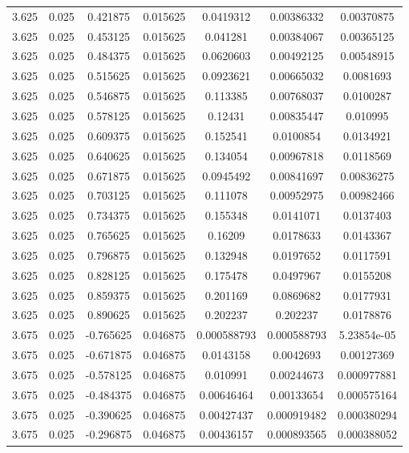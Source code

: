 \begin{table}[bh]
\begin{center}
{\begin{tabular}{ccccccc}
3.625	 & 0.025 & 	0.421875	 & 0.015625	 & 0.0419312	 & 0.00386332	 & 0.00370875 \\ 
3.625	 & 0.025 & 	0.453125	 & 0.015625	 & 0.041281	 & 0.00384067	 & 0.00365125 \\ 
3.625	 & 0.025 & 	0.484375	 & 0.015625	 & 0.0620603	 & 0.00492125	 & 0.00548915 \\ 
3.625	 & 0.025 & 	0.515625	 & 0.015625	 & 0.0923621	 & 0.00665032	 & 0.0081693 \\ 
3.625	 & 0.025 & 	0.546875	 & 0.015625	 & 0.113385	 & 0.00768037	 & 0.0100287 \\ 
3.625	 & 0.025 & 	0.578125	 & 0.015625	 & 0.12431	 & 0.00835447	 & 0.010995 \\ 
3.625	 & 0.025 & 	0.609375	 & 0.015625	 & 0.152541	 & 0.0100854	 & 0.0134921 \\ 
3.625	 & 0.025 & 	0.640625	 & 0.015625	 & 0.134054	 & 0.00967818	 & 0.0118569 \\ 
3.625	 & 0.025 & 	0.671875	 & 0.015625	 & 0.0945492	 & 0.00841697	 & 0.00836275 \\ 
3.625	 & 0.025 & 	0.703125	 & 0.015625	 & 0.111078	 & 0.00952975	 & 0.00982466 \\ 
3.625	 & 0.025 & 	0.734375	 & 0.015625	 & 0.155348	 & 0.0141071	 & 0.0137403 \\ 
3.625	 & 0.025 & 	0.765625	 & 0.015625	 & 0.16209	 & 0.0178633	 & 0.0143367 \\ 
3.625	 & 0.025 & 	0.796875	 & 0.015625	 & 0.132948	 & 0.0197652	 & 0.0117591 \\ 
3.625	 & 0.025 & 	0.828125	 & 0.015625	 & 0.175478	 & 0.0497967	 & 0.0155208 \\ 
3.625	 & 0.025 & 	0.859375	 & 0.015625	 & 0.201169	 & 0.0869682	 & 0.0177931 \\ 
3.625	 & 0.025 & 	0.890625	 & 0.015625	 & 0.202237	 & 0.202237	 & 0.0178876 \\ 
3.675	 & 0.025 & 	-0.765625	 & 0.046875	 & 0.000588793	 & 0.000588793	 & 5.23854e-05 \\ 
3.675	 & 0.025 & 	-0.671875	 & 0.046875	 & 0.0143158	 & 0.0042693	 & 0.00127369 \\ 
3.675	 & 0.025 & 	-0.578125	 & 0.046875	 & 0.010991	 & 0.00244673	 & 0.000977881 \\ 
3.675	 & 0.025 & 	-0.484375	 & 0.046875	 & 0.00646464	 & 0.00133654	 & 0.000575164 \\ 
3.675	 & 0.025 & 	-0.390625	 & 0.046875	 & 0.00427437	 & 0.000919482	 & 0.000380294 \\ 
3.675	 & 0.025 & 	-0.296875	 & 0.046875	 & 0.00436157	 & 0.000893565	 & 0.000388052 \\ 

\end{tabular}}
\end{center}
\end{table}
